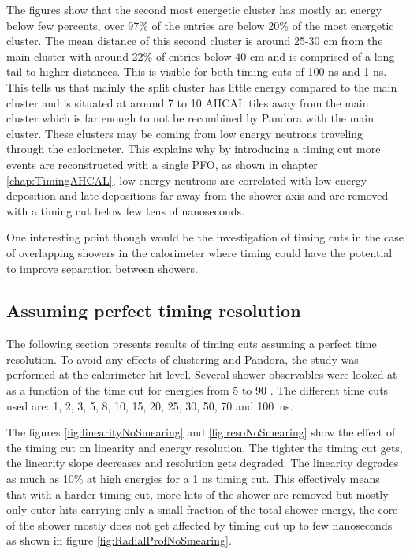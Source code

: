 The figures show that the second most energetic cluster has mostly an energy below few percents, over 97\% of the entries are below 20\% of the most energetic cluster. The mean distance of this second cluster is around 25-30 cm from the main cluster with around 22\% of entries below 40 cm and is comprised of a long tail to higher distances. This is visible for both timing cuts of 100 ns and 1 ns. This tells us that mainly the split cluster has little energy compared to the main cluster and is situated at around 7 to 10 AHCAL tiles away from the main cluster which is far enough to not be recombined by Pandora with the main cluster. These clusters may be coming from low energy neutrons traveling through the calorimeter. This explains why by introducing a timing cut more events are reconstructed with a single PFO, as shown in chapter \ref{chap:TimingAHCAL}, low energy neutrons are correlated with low energy deposition and late depositions far away from the shower axis and are removed with a timing cut below few tens of nanoseconds.

One interesting point though would be the investigation of timing cuts in the case of overlapping showers in the calorimeter where timing could have the potential to improve separation between showers.

\subsection{Assuming perfect timing resolution}
\label{sec:MCLevelILDTiming}

The following section presents results of timing cuts assuming a perfect time resolution. To avoid any effects of clustering and Pandora, the study was performed at the calorimeter hit level. Several shower observables were looked at as a function of the time cut for energies from 5 \GeV to 90 \GeV \kzeroL. The different time cuts used are: 1, 2, 3, 5, 8, 10, 15, 20, 25, 30, 50, 70 and \SI{100}{\nano\second}.

The figures \ref{fig:linearityNoSmearing} and \ref{fig:resoNoSmearing} show the effect of the timing cut on linearity and energy resolution. The tighter the timing cut gets, the linearity slope decreases and resolution gets degraded. The linearity degrades as much as 10\% at high energies for a 1 ns timing cut. This effectively means that with a harder timing cut, more hits of the shower are removed but mostly only outer hits carrying only a small fraction of the total shower energy, the core of the shower mostly does not get affected by timing cut up to few nanoseconds as shown in figure \ref{fig:RadialProfNoSmearing}.

